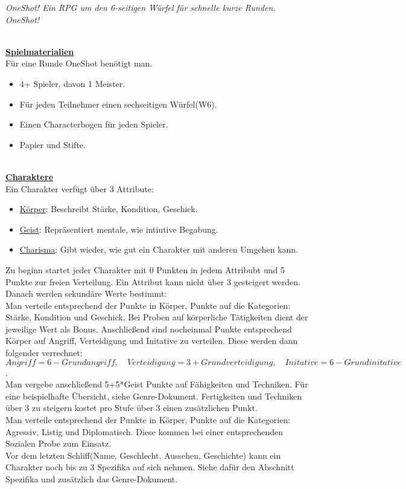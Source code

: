 \documentclass[twoside,a4paper]{minimal}
\begin{document}
\textit{OneShot! Ein RPG um den 6-seitigen Würfel für schnelle kurze Runden. OneShot!}
\setlength{\columnsep}{5pt}
\begin{multicols*}{3}
\textbf{\uline{\\Spielmaterialien}}
\\Für eine Runde OneShot benötigt man.
\begin{itemize}
\item 4+ Spieler, davon 1 Meister.
\item Für jeden Teilnehmer einen sechseitigen Würfel(W6).
\item Einen Characterbogen für jeden Spieler.
\item Papier und Stifte.
\end{itemize}
\textbf{\uline{\\Charaktere}}
\\Ein Charakter verfügt über 3 Attribute:
\begin{itemize}
\item \uline{Körper}: Beschreibt Stärke, Kondition, Geschick. 
\item \uline{Geist}: Repräsentiert mentale, wie intiutive Begabung.
\item \uline{Charisma}: Gibt wieder, wie gut ein Charakter mit anderen Umgehen kann.
\end{itemize}
Zu beginn startet jeder Charakter mit 0 Punkten in jedem Attribubt und 5 Punkte zur freien Verteilung. Ein Attribut kann nicht über 3 gesteigert werden. Danach werden sekundäre Werte bestimmt:
\\Man verteile entsprechend der Punkte in Körper, Punkte auf die Kategorien: Stärke, Kondition und Geschick. Bei Proben auf körperliche Tätigkeiten dient der jeweilige Wert als Bonus. Anschließend sind nocheinmal Punkte entsprechend Körper auf Angriff, Verteidigung und Initative zu verteilen. Diese werden dann folgender verrechnet:\\$Angriff=6-Grundangriff,\quad Verteidigung=3+Grundverteidigung,\quad Initative=6-Grundinitative$.
\\Man vergebe anschließend 5+5*Geist Punkte auf Fähigkeiten und Techniken. Für eine beispielhafte Übersicht, siehe Genre-Dokument. Fertigkeiten und Techniken über 3 zu steigern kostet pro Stufe über 3 einen zusätzlichen Punkt.
\\Man verteile entsprechend der Punkte in Körper, Punkte auf die Kategorien: Agressiv, Listig und Diplomatisch. Diese kommen bei einer entsprechenden Sozialen Probe zum Einsatz.
\\Vor dem letzten Schliff(Name, Geschlecht, Aussehen, Geschichte) kann ein Charakter noch bis zu 3 Spezifika auf sich nehmen. Siehe dafür den Abschnitt Spezifika und zusätzlich das Genre-Dokument.

\end{multicols*}
\end{document}
